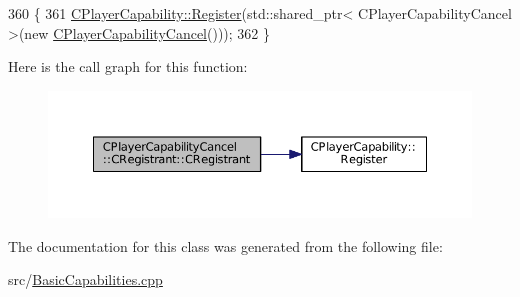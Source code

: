 \begin{DoxyCode}
360                                                \{
361     \hyperlink{classCPlayerCapability_a7e298018dcde2684451add3cfff065f7}{CPlayerCapability::Register}(std::shared\_ptr< CPlayerCapabilityCancel >(\textcolor{keyword}{new} 
      \hyperlink{classCPlayerCapabilityCancel_a7e3ac034b99b436032fdd2059d2fb727}{CPlayerCapabilityCancel}()));   
362 \}
\end{DoxyCode}
Here is the call graph for this function\+:
\nopagebreak
\begin{figure}[H]
\begin{center}
\leavevmode
\includegraphics[width=350pt]{classCPlayerCapabilityCancel_1_1CRegistrant_a78f5bc9125ca55fc86efdabf1faaa363_cgraph}
\end{center}
\end{figure}


The documentation for this class was generated from the following file\+:\begin{DoxyCompactItemize}
\item 
src/\hyperlink{BasicCapabilities_8cpp}{Basic\+Capabilities.\+cpp}\end{DoxyCompactItemize}

